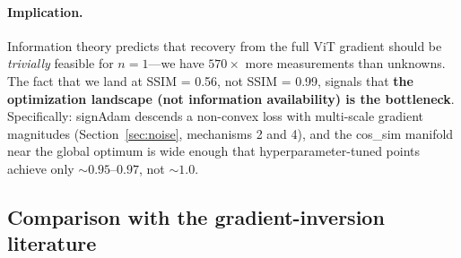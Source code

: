 \documentclass[11pt,a4paper]{article}
\begin{document}
\paragraph{Implication.} Information theory predicts that recovery from the full ViT gradient should be \emph{trivially} feasible for $n=1$---we have $570\times$ more measurements than unknowns. The fact that we land at SSIM = 0.56, not SSIM = 0.99, signals that \textbf{the optimization landscape (not information availability) is the bottleneck}. Specifically: signAdam descends a non-convex loss with multi-scale gradient magnitudes (Section~\ref{sec:noise}, mechanisms 2 and 4), and the cos\_sim manifold near the global optimum is wide enough that hyperparameter-tuned points achieve only $\sim 0.95$--$0.97$, not $\sim 1.0$.

\subsection{Comparison with the gradient-inversion literature}

\begin{table}[h!]
\centering
\footnotesize
{}
\caption{Phase 0 vs related work. PSNR and SSIM ranges are typical reported values, not strictly comparable across datasets/architectures.}
\label{tab:litcompare}
\end{table}
\end{document}
